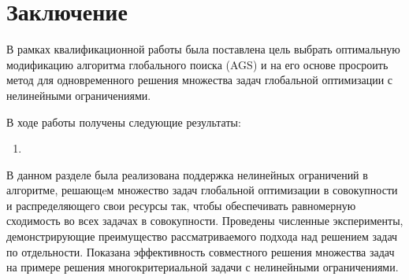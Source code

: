\section{Заключение}

В рамках квалификационной работы была поставлена цель выбрать оптимальную модификацию алгоритма глобального поиска (AGS)
и на его основе просроить метод для одновременного решения множества задач глобальной оптимизации с нелинейными ограничениями.

В ходе работы получены следующие результаты:
\begin{enumerate}
    \item 
\end{enumerate}


В данном разделе была реализована поддержка нелинейных ограничений в алгоритме, решающeм
множество задач глобальной оптимизации в совокупности и распределяющего свои ресурсы так, чтобы 
обеспечивать равномерную сходимость во всех задачах в совокупности. Проведены численные эксперименты, демонстрирующие
преимущество рассматриваемого подхода над решением задач по отдельности. Показана эффективность
совместного решения множества задач на примере решения многокритериальной задачи с
нелинейными ограничениями.
